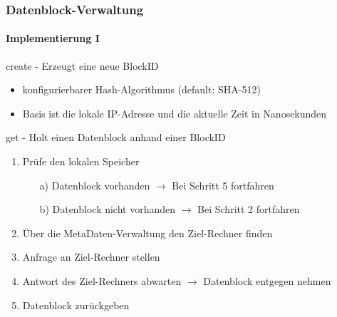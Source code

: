 \documentclass{beamer}
\begin{document}
		\begin{frame}
			\frametitle{Datenblock-Verwaltung}
			\framesubtitle{Implementierung I}

			\begin{block}{create - Erzeugt eine neue BlockID}
				\begin{itemize}
					\item konfigurierbarer Hash-Algorithmus (default: SHA-512)
					\item Basis ist die lokale IP-Adresse und die aktuelle Zeit in Nanosekunden
				\end{itemize}
			\end{block}

			\begin{block}{get - Holt einen Datenblock anhand einer BlockID}
				\begin{enumerate}
					\item Prüfe den lokalen Speicher
						\begin{enumerate}
							\item[a)] Datenblock vorhanden $\rightarrow$ Bei Schritt 5 fortfahren
							\item[b)] Datenblock nicht vorhanden $\rightarrow$ Bei Schritt 2 fortfahren
						\end{enumerate}
					\item Über die MetaDaten-Verwaltung den Ziel-Rechner finden
					\item Anfrage an Ziel-Rechner stellen
					\item Antwort des Ziel-Rechners abwarten $\rightarrow$ Datenblock entgegen nehmen
					\item Datenblock zurückgeben
				\end{enumerate}
			\end{block}
		\end{frame}
\end{document}
